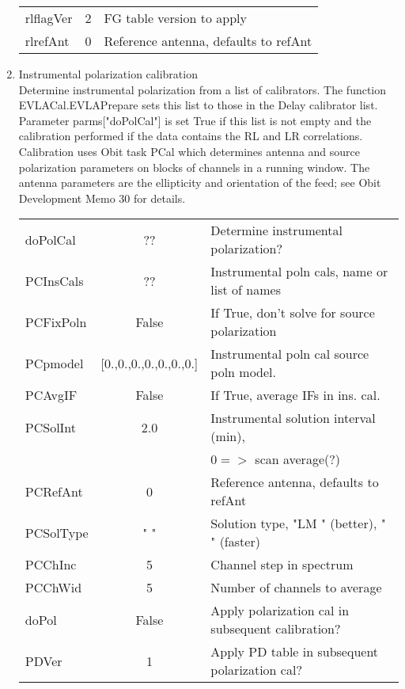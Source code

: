 \documentclass[11pt]{article}
\begin{document}
\begin{enumerate}
\begin{center}
\begin{tabular}{|l|c|l|}
rlflagVer   & 2            & FG table version to apply \\
rlrefAnt    & 0            & Reference antenna, defaults to refAnt\\
\hline
\end{tabular}
\end{center}
%
\item Instrumental polarization calibration\\
Determine instrumental polarization from a list of calibrators.
The function EVLACal.EVLAPrepare sets this list to those in the Delay
calibrator list.
Parameter parms["doPolCal"] is set True if this list is not empty and
the calibration performed if the data contains the RL and LR
correlations. 
Calibration uses Obit task PCal which determines antenna and source
polarization parameters on blocks of channels in a running window.
The antenna parameters are the ellipticity and orientation of the
feed; see Obit Development Memo 30 for details.\\
\begin{center}
\begin{tabular}{|l|c|l|}
\hline
doPolCal  & ??     &  Determine instrumental polarization? \\
PCInsCals & ??     &  Instrumental poln cals, name or list of names\\
PCFixPoln & False  &  If True, don't solve for source polarization\\
PCpmodel  & [0.,0.,0.,0.,0.,0.,0.] &  Instrumental poln cal source poln model.\\
PCAvgIF   & False  &  If True, average IFs in ins. cal.\\
PCSolInt  & 2.0    &  Instrumental solution interval (min), \\
          &        & $0=>$ scan average(?) \\
PCRefAnt  & 0      &  Reference antenna, defaults to refAnt\\
PCSolType & "    " &  Solution type, "LM  " (better), "    " (faster)\\
PCChInc   & 5      &  Channel step in spectrum \\
PCChWid   & 5      &  Number of channels to average \\
doPol     & False  &  Apply polarization cal in subsequent calibration?\\
PDVer     & 1      &  Apply PD table in subsequent polarization cal?\\

\end{tabular}
\end{center}
\end{enumerate}
\end{document}
